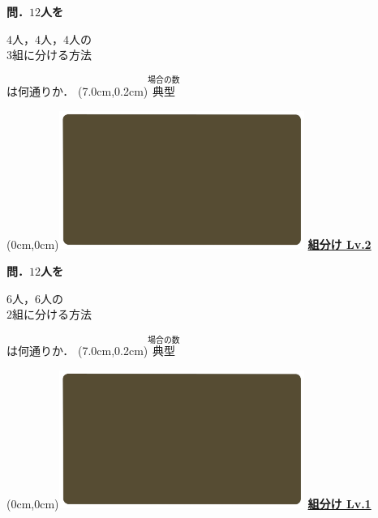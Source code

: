\documentclass[10pt,
fleqn,
dvipdfmx,
uplatex
]{jsarticle}
\begin{document}
\large 
\bf\boldmath 問．${12}$人を

\Huge
\vspace{-0.3zw}
\hspace{0.1zw} $4$人，$4$人，$4$人の\vspace{-0.2zw}\\
\hfill $3$組に分ける方法\hspace{0.1zw} 

\large
\vspace{0.1zw}
\hfill は何通りか．
\at(7.0cm,0.2cm){\small\color{bradorange}$\overset{\text{場合の数}}{\text{典型}}$}

\newpage

\at(0cm,0cm){\includegraphics[width=8cm,bb=0 0 1920 1080]{./youtube/thumbnails/templates/smart_background/場合の数.jpeg}}
{\color{orange}\bf\boldmath\huge\underline{組分け Lv.2 }}\vspace{0.3zw}

\large 
\bf\boldmath 問．${12}$人を

\Huge
\vspace{-0.3zw}
\hspace{0.1zw} $6$人，$6$人の\vspace{-0.2zw}\\
\hfill $2$組に分ける方法\hspace{0.1zw} 

\large
\vspace{0.1zw}
\hfill は何通りか．
\at(7.0cm,0.2cm){\small\color{bradorange}$\overset{\text{場合の数}}{\text{典型}}$}

\newpage

\at(0cm,0cm){\includegraphics[width=8cm,bb=0 0 1920 1080]{./youtube/thumbnails/templates/smart_background/場合の数.jpeg}}
{\color{orange}\bf\boldmath\huge\underline{組分け Lv.1 }}\vspace{0.3zw}
\end{document}

